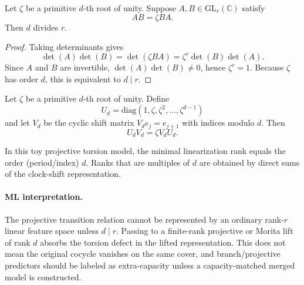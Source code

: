 \begin{proposition}
Let $\zeta$ be a primitive $d$-th root of unity.  Suppose $A,B \in
\mathrm{GL}_r(\mathbb{C})$ satisfy
\[
  A B = \zeta B A .
\]
Then $d$ divides $r$.
\end{proposition}

\begin{proof}
Taking determinants gives
\[
  \det(A)\det(B) = \det(\zeta B A) = \zeta^r \det(B)\det(A).
\]
Since $A$ and $B$ are invertible, $\det(A)\det(B) \ne 0$, hence
$\zeta^r = 1$.  Because $\zeta$ has order $d$, this is equivalent to
$d \mid r$.
\end{proof}

\begin{proposition}
Let $\zeta$ be a primitive $d$-th root of unity.  Define
\[
  U_d = \mathrm{diag}(1,\zeta,\zeta^2,\ldots,\zeta^{d-1})
\]
and let $V_d$ be the cyclic shift matrix $V_d e_j=e_{j+1}$ with indices
modulo $d$.  Then
\[
  U_d V_d = \zeta V_d U_d .
\]
\end{proposition}

\begin{corollary}
In this toy projective torsion model, the minimal linearization rank equals
the order (period/index) $d$.  Ranks that are multiples of $d$ are obtained by
direct sums of the clock-shift representation.
\end{corollary}

\paragraph{ML interpretation.}
The projective transition relation cannot be represented by an ordinary
rank-$r$ linear feature space unless $d \mid r$.  Passing to a finite-rank
projective or Morita lift of rank $d$ absorbs the torsion defect in the lifted
representation.  This does not mean the original cocycle vanishes on the same
cover, and branch/projective predictors should be labeled as extra-capacity
unless a capacity-matched merged model is constructed.

